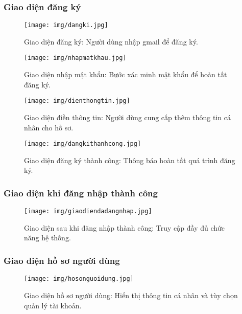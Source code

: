 \documentclass[a4paper,12pt]{article}
\begin{document}
\subsubsection{Giao diện đăng ký}
\begin{figure}[H]
  \centering
  \texttt{[image: img/dangki.jpg]}
  \caption{Giao diện đăng ký: Người dùng nhập gmail để đăng ký.}
  \label{fig:dangki}
\end{figure}

\begin{figure}[H]
  \centering
  \texttt{[image: img/nhapmatkhau.jpg]}
  \caption{Giao diện nhập mật khẩu: Bước xác minh mật khẩu để hoàn tất đăng ký.}
  \label{fig:nhapmatkhau}
\end{figure}

\begin{figure}[H]
  \centering
  \texttt{[image: img/dienthongtin.jpg]}
  \caption{Giao diện điền thông tin: Người dùng cung cấp thêm thông tin cá nhân cho hồ sơ.}
  \label{fig:dienthongtin}
\end{figure}

\begin{figure}[H]
  \centering
  \texttt{[image: img/dangkithanhcong.jpg]}
  \caption{Giao diện đăng ký thành công: Thông báo hoàn tất quá trình đăng ký.}
  \label{fig:dangkithanhcong}
\end{figure}

\subsubsection{Giao diện khi đăng nhập thành công}
\begin{figure}[H]
  \centering
  \texttt{[image: img/giaodiendadangnhap.jpg]}
  \caption{Giao diện sau khi đăng nhập thành công: Truy cập đầy đủ chức năng hệ thống.}
  \label{fig:giaodiendadangnhap}
\end{figure}

\subsubsection{Giao diện hồ sơ người dùng}
\begin{figure}[H]
  \centering
  \texttt{[image: img/hosonguoidung.jpg]}
  \caption{Giao diện hồ sơ người dùng: Hiển thị thông tin cá nhân và tùy chọn quản lý tài khoản.}
  \label{fig:hosonguoidung}
\end{figure}
\end{document}
